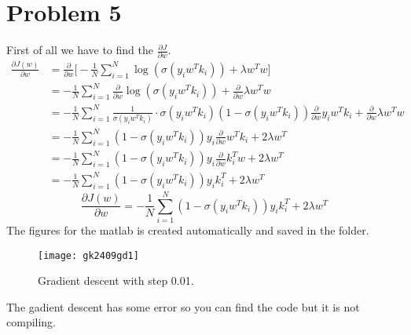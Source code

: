 \section{Problem 5}
First of all we have to find the $\frac{\partial J}{\partial w}$.
\begin{align*}
\frac{\partial J(w)}{\partial w} &=\frac{\partial }{\partial w} \Big[-\frac{1}{N} \sum_{i=1}^{N}\log (\sigma(y_iw^Tk_i))+\lambda w^Tw \Big]\\
&= -\frac{1}{N} \sum_{i=1}^{N} \frac{\partial }{\partial w} \log (\sigma(y_iw^Tk_i)) + \frac{\partial }{\partial w}\lambda w^Tw \\
&= -\frac{1}{N} \sum_{i=1}^{N} \frac{1}{\sigma(y_iw^Tk_i)}\cdot \sigma(y_iw^Tk_i) (1- \sigma(y_iw^Tk_i)) \frac{\partial }{\partial w}y_iw^Tk_i + \frac{\partial }{\partial w}\lambda w^Tw\\
&= -\frac{1}{N} \sum_{i=1}^{N} (1- \sigma(y_iw^Tk_i))y_i\frac{\partial }{\partial w}w^Tk_i + 2\lambda w^T\\
&= -\frac{1}{N} \sum_{i=1}^{N} (1- \sigma(y_iw^Tk_i))y_i\frac{\partial }{\partial w}k_i^Tw + 2\lambda w^T\\
&= -\frac{1}{N} \sum_{i=1}^{N} (1- \sigma(y_iw^Tk_i))y_ik_i^T + 2\lambda w^T
\end{align*}
\begin{equation*}
\frac{\partial J(w)}{\partial w} = -\frac{1}{N} \sum_{i=1}^{N} (1- \sigma(y_iw^Tk_i))y_ik_i^T + 2\lambda w^T
\end{equation*}
The figures for the matlab is created automatically and saved in the folder.
\begin{figure}[h!]
  \caption{Gradient descent with step 0.01.}
  \centering
    \texttt{[image: gk2409gd1]}
\end{figure}

The gadient descent has some error so you can find the code but it is not compiling.
